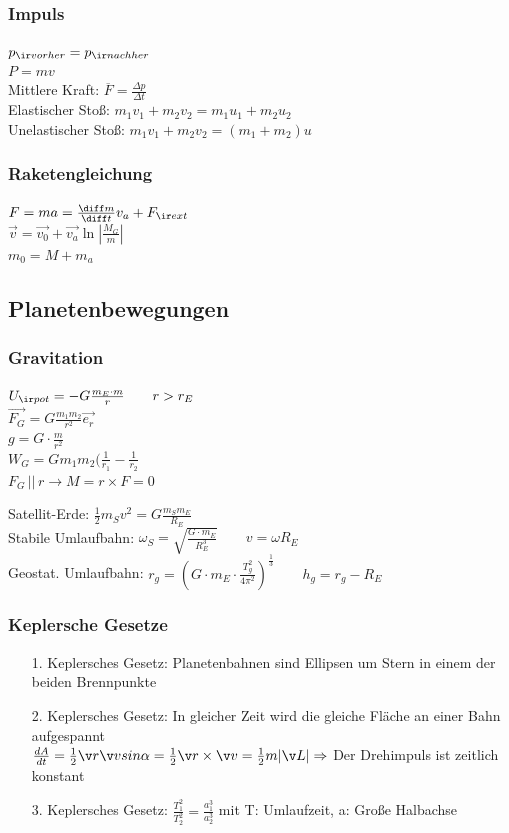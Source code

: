 \documentclass[german]{latex4ei/latex4ei_sheet}
\begin{document}
\subsubsection{Impuls}
$p_{\ir vorher}=p_{\ir nachher}$\\
$P=mv$\\
Mittlere Kraft: $\overline{F}=\frac{\Delta p}{\Delta t}$\\
Elastischer Stoß: $m_1v_1+m_2v_2=m_1u_1+m_2u_2$\\
Unelastischer Stoß: $m_1v_1+m_2v_2=(m_1+m_2)u$
\subsubsection{Raketengleichung}
$F=ma=\frac{\diff m}{\diff t}v_a+F_{\ir ext}$\\
$\vec{v}=\vec{v_0}+\vec{v_a}\ln | \frac{M_G}{m} | $\\
$m_0=M+m_a$
\subsection{Planetenbewegungen}
\subsubsection{Gravitation}
$U_{\ir pot}=-G\frac{m_E\cdot m}{r} \qquad r>r_E$\\
$\vec{F_G}=G\frac{m_1m_2}{r^2}\vec{e_r}$\\
$g=G\cdot \frac{m}{r^2}$\\
$W_G=Gm_1m_2(\frac{1}{r_1}-\frac{1}{r_2}$\\
$F_G \, || \, r \rightarrow M=r\times F=0$\\
\begin{sectionbox}
Satellit-Erde: $\frac{1}{2}m_Sv^2=G\frac{m_Sm_E}{R_E}$ \\
Stabile Umlaufbahn: $\omega_S=\sqrt{\frac{G\cdot m_E}{R_E^3}}\qquad v=\omega R_E$\\
Geostat. Umlaufbahn: $r_g=(G\cdot m_E \cdot \frac{T_g^2}{4\pi^2})^{\frac{1}{3}} \qquad h_g=r_g-R_E$
\end{sectionbox}
\subsubsection{Keplersche Gesetze}
\begin{itemize}
\item[1.] Keplersches Gesetz: Planetenbahnen sind Ellipsen um Stern in einem der beiden Brennpunkte\\
\item[2.] Keplersches Gesetz: In gleicher Zeit wird die gleiche Fläche an einer Bahn aufgespannt\\$\frac{dA}{dt} = \frac{1}{2} \v r \v v sin \alpha = \frac{1}{2}\v r \times \v v = \frac{1}{2}m|\v L| \Rightarrow$ Der Drehimpuls ist zeitlich konstant\\
\item[3.] Keplersches Gesetz: $\frac{T_1^2}{T_2^2} = \frac{a_1^3}{a_2^3}$ mit T: Umlaufzeit, a: Große Halbachse\\
\end{itemize}
\end{document}

